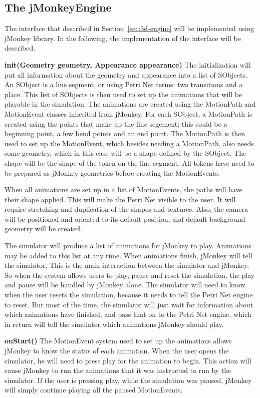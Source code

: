 \subsection{The jMonkeyEngine}

The interface that described in Section~\ref{sec:3d-engine} will be implemented using jMonkey library. In the following, the implementation of the interface will be described.

\textbf{init(Geometry geometry, Appearance appearance)}
The initialization will put all information about the geometry and appearance into a list of SObjects. An SObject is a line segment, or using Petri Net terms: two transitions and a place. This list of SObjects is then used to set up the animations that will be playable in the simulation. The animations are created using the MotionPath and MotionEvent classes inherited from jMonkey. For each SObject, a MotionPath is created using the points that make up the line segement; this could be a beginning point, a few bend points and an end point. The MotionPath is then used to set up the MotionEvent, which besides needing a MotionPath, also needs some geometry, which in this case will be a shape defined by the SObject. The shape will be the shape of the token on the line segment. All tokens have need to be prepared as jMonkey geometries before creating the MotionEvents.

When all animations are set up in a list of MotionEvents, the paths will have their shape applied. This will make the Petri Net visible to the user. It will require stretching and duplication of the shapes and textures. Also, the camera will be positioned and oriented to its default position, and default background geometry will be created.

The simulator will produce a list of animations for jMonkey to play. Animations may be added to this list at any time. When animations finish, jMonkey will tell the simulator. This is the main interaction between the simulator and jMonkey. So when the system allows users to play, pause and reset the simulation, the play and pause will be handled by jMonkey alone. The simulator will need to know when the user resets the simulation, because it needs to tell the Petri Net engine to reset. But most of the time, the simulator will just wait for information about which animations have finished, and pass that on to the Petri Net engine, which in return will tell the simulator which animations jMonkey should play.

\textbf{onStart()}
The MotionEvent system used to set up the animations allows jMonkey to know the status of each animation. When the user opens the simulator, he will need to press play for the animation to begin. This action will cause jMonkey to run the animations that it was instructed to run by the simulator. If the user is pressing play, while the simulation was paused, jMonkey will simply continue playing all the paused MotionEvents.

